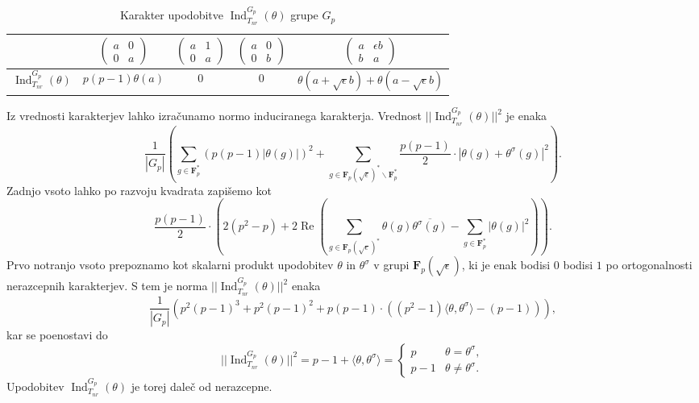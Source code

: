 \documentclass[11pt]{book}
\def\FF{\mathbf{F}}
\DeclareMathOperator\Ind{Ind}
\DeclareMathOperator\Realpart{Re}
\theoremstyle{definition}
\theoremstyle{zgled}
\theoremstyle{odprtproblem}
\theoremstyle{domacanaloga}
\theoremstyle{izrek}
\begin{document}
\begin{table}[ht]
    \centering
\begin{tabular}{l|*{4}{c}}
    & 
    $\begin{pmatrix}
        a & 0 \\ 0 & a
    \end{pmatrix}$
    &
    $\begin{pmatrix}
        a & 1 \\ 0 & a
    \end{pmatrix}$
    &
    $\begin{pmatrix}
        a & 0 \\ 0 & b
    \end{pmatrix}$
    &
    $\begin{pmatrix}
        a & \epsilon b \\ b & a
    \end{pmatrix}$ \\ \hline
    $\Ind_{T_{nr}}^{G_p}(\theta)$ & $p(p-1) \theta(a)$ & $0$ & $0$ & $\theta(a + \sqrt{\epsilon}b) + \theta(a - \sqrt{\epsilon}b)$ \\
\end{tabular}
\caption{Karakter upodobitve $\Ind_{T_{nr}}^{G_p}(\theta)$ grupe $G_p$}
\end{table}

Iz vrednosti karakterjev lahko izračunamo normo induciranega karakterja. Vrednost $|| \Ind_{T_{nr}}^{G_p}(\theta) ||^2$ je enaka
\[
    \frac{1}{|G_p|} \left(  \sum_{g \in \FF_p^*} (p (p-1) |\theta(g)|)^2 + \sum_{g \in \FF_p(\sqrt{\epsilon})^* \backslash \FF_p^*} \frac{p(p-1)}{2} \cdot |\theta(g) + \theta^{\sigma}(g)|^2 \right).
\]
Zadnjo vsoto lahko po razvoju kvadrata zapišemo kot
\[
    \frac{p(p-1)}{2} \cdot \left( 2 (p^2  - p) + 2 \Realpart \left( \sum_{g \in \FF_p(\sqrt{\epsilon})^*} \theta(g) \overline{\theta^{\sigma}(g)} - \sum_{g \in \FF_p^*}  |\theta(g)|^2 \right) \right).
\]
Prvo notranjo vsoto prepoznamo kot skalarni produkt upodobitev $\theta$ in $\theta^{\sigma}$ v grupi $\FF_p(\sqrt{\epsilon})$, ki je enak bodisi $0$ bodisi $1$ po ortogonalnosti nerazcepnih karakterjev. S tem je norma $|| \Ind_{T_{nr}}^{G_p}(\theta) ||^2$ enaka
\[
    \frac{1}{|G_p|} \left( p^2(p-1)^3 + p^2(p-1)^2 + p(p-1) \cdot \left(  (p^2 - 1) \langle \theta, \theta^{\sigma} \rangle - (p-1) \right) \right),
\]
kar se poenostavi do
\[
    || {\textstyle \Ind_{T_{nr}}^{G_p}(\theta)} ||^2 = p-1 + \langle \theta, \theta^{\sigma} \rangle = \begin{cases}
        p & \theta = \theta^\sigma, \\
        p-1 & \theta \neq \theta^{\sigma}.
    \end{cases}
\]
Upodobitev $\Ind_{T_{nr}}^{G_p}(\theta)$ je torej daleč od nerazcepne.
\end{document}
